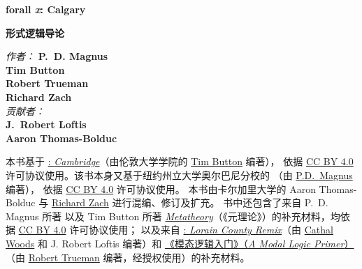 
\ifHTMLtarget\else

\pagestyle{empty}

\vspace*{80pt}

\begin{raggedleft}
\fontsize{30pt}{24pt}\sffamily
\selectfont
  \textbf{forall
  {\fontsize{37pt}{24pt}\selectfont\rmfamily\textit{x}}:
  Calgary}

\medskip\fontsize{18pt}{20pt}\selectfont

\textbf{形式逻辑导论}

\vfill
\fontsize{12pt}{16pt}\selectfont \textit{作者：} \textbf{P.~D. Magnus}\\
\textbf{Tim Button}\\
\textbf{Robert Trueman}\\
\textbf{Richard Zach}\\
\textit{贡献者：}\\
\textbf{J.~Robert Loftis}\\
\textbf{Aaron Thomas-Bolduc}\\

\vfill
\textbf{\forallxversion}\par
\end{raggedleft}

\newpage

\noindent\small%
\fi
本书基于
\href{https://www.homepages.ucl.ac.uk/~uctytbu/OERs.html}{\forallx:
\textit{Cambridge}}（由伦敦大学学院的
\href{https://www.homepages.ucl.ac.uk/~uctytbu/}{Tim Button} 编著），
依据 \href{https://creativecommons.org/licenses/by/4.0/}{CC BY
4.0} 许可协议使用。该书本身又基于纽约州立大学奥尔巴尼分校的
\href{https://www.fecundity.com/logic/}{\forallx}（由
\href{https://www.fecundity.com/job/}{P.D.\ Magnus} 编著），
依据 \href{https://creativecommons.org/licenses/by/4.0/}{CC BY
4.0} 许可协议使用。
本书由卡尔加里大学的 Aaron Thomas-Bolduc 与 \href{https://richardzach.org/}{Richard Zach} 进行混编、修订及扩充。
书中还包含了来自 P.~D. Magnus 所著 \forallx{} 以及 Tim Button 所著
\href{https://www.homepages.ucl.ac.uk/~uctytbu/OERs.html}{\textit{Metatheory}}（《元理论》）的补充材料，均依据
\href{https://creativecommons.org/licenses/by/4.0/}{CC BY 4.0} 许可协议使用；
以及来自 \href{https://github.com/rob-helpy-chalk/openintroduction}{\forallx: \textit{Lorain
County Remix}}（由 \href{https://sites.google.com/site/cathalwoods/}{Cathal Woods} 和
J. Robert Loftis 编著）和 \href{http://www.rtrueman.com/uploads/7/0/3/2/70324387/modal_logic_primer.pdf}{《模态逻辑入门》（\textit{A Modal Logic Primer}）}（由 \href{http://www.rtrueman.com/}{Robert Trueman} 编著，经授权使用）的补充材料。

